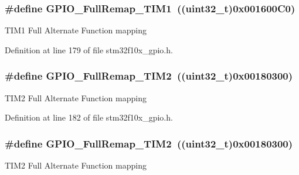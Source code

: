 \subsubsection[{\texorpdfstring{G\+P\+I\+O\+\_\+\+Full\+Remap\+\_\+\+T\+I\+M1}{GPIO_FullRemap_TIM1}}]{\setlength{\rightskip}{0pt plus 5cm}\#define G\+P\+I\+O\+\_\+\+Full\+Remap\+\_\+\+T\+I\+M1~(({\bf uint32\+\_\+t})0x001600\+C0)}\hypertarget{group___g_p_i_o___remap__define_gaf1f2d5cbc2281b3e3a6cc51c3fe7f77f}{}\label{group___g_p_i_o___remap__define_gaf1f2d5cbc2281b3e3a6cc51c3fe7f77f}
T\+I\+M1 Full Alternate Function mapping 

Definition at line 179 of file stm32f10x\+\_\+gpio.\+h.

\subsubsection[{\texorpdfstring{G\+P\+I\+O\+\_\+\+Full\+Remap\+\_\+\+T\+I\+M2}{GPIO_FullRemap_TIM2}}]{\setlength{\rightskip}{0pt plus 5cm}\#define G\+P\+I\+O\+\_\+\+Full\+Remap\+\_\+\+T\+I\+M2~(({\bf uint32\+\_\+t})0x00180300)}\hypertarget{group___g_p_i_o___remap__define_ga2bd999e77236155935d2a598d4bac2a9}{}\label{group___g_p_i_o___remap__define_ga2bd999e77236155935d2a598d4bac2a9}
T\+I\+M2 Full Alternate Function mapping 

Definition at line 182 of file stm32f10x\+\_\+gpio.\+h.

\subsubsection[{\texorpdfstring{G\+P\+I\+O\+\_\+\+Full\+Remap\+\_\+\+T\+I\+M2}{GPIO_FullRemap_TIM2}}]{\setlength{\rightskip}{0pt plus 5cm}\#define G\+P\+I\+O\+\_\+\+Full\+Remap\+\_\+\+T\+I\+M2~(({\bf uint32\+\_\+t})0x00180300)}\hypertarget{group___g_p_i_o___remap__define_ga2bd999e77236155935d2a598d4bac2a9}{}\label{group___g_p_i_o___remap__define_ga2bd999e77236155935d2a598d4bac2a9}
T\+I\+M2 Full Alternate Function mapping 

